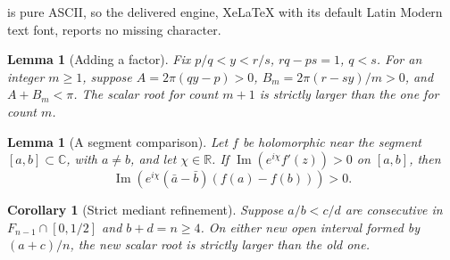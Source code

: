 \documentclass[10pt,a4paper]{amsart}
\newtheorem{corollary}[theorem]{Corollary}
\newtheorem{lemma}[theorem]{Lemma}
\begin{document}
is pure ASCII, so the delivered engine, XeLaTeX with its default Latin Modern text font, reports no missing character.
\begin{lemma}[Adding a factor]\label{lem:add-factor}
Fix $p/q<y<r/s$, $rq-ps=1$, $q<s$.
For an integer $m\ge1$, suppose
$A=2\pi(qy-p)>0$, $B_m=2\pi(r-sy)/m>0$, and $A+B_m<\pi$.
The scalar root for count $m+1$ is strictly larger than the one for count $m$.
\end{lemma}

\begin{lemma}[A segment comparison]
\label{thm:sector-difference}
Let $f$ be holomorphic near the segment $[a,b]\subset\mathbb C$, with $a\ne b$,
and let $\chi\in\mathbb R$.  If
$\operatorname{Im}(e^{i\chi}f'(z))>0$ on $[a,b]$, then
\[
 \operatorname{Im}\!\left(e^{i\chi}
          (\bar a-\bar b)(f(a)-f(b))\right)>0.
\]
\end{lemma}

\begin{corollary}[Strict mediant refinement]\label{lem:positive-mediant}
Suppose $a/b<c/d$ are consecutive in $F_{n-1}\cap[0,1/2]$ and
$b+d=n\ge4$.  On either new open interval formed by $(a+c)/n$, the new scalar
root is strictly larger than the old one.
\end{corollary}
\end{document}
